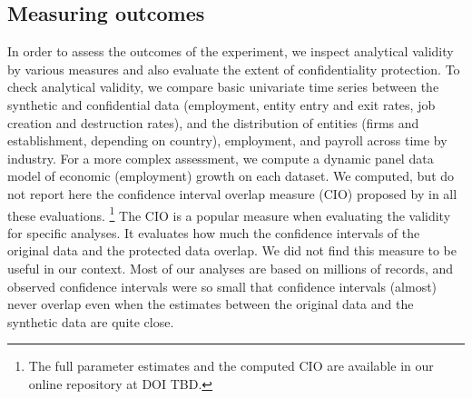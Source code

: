 \subsection{Measuring outcomes}

In order to assess the outcomes of the experiment, we inspect analytical validity by various measures and also evaluate the extent of confidentiality protection. To check analytical validity, we compare basic univariate time series between the synthetic and confidential data (employment, entity entry and exit rates, job creation and destruction rates), and the distribution of entities (firms and establishment, depending on country),  employment, and payroll across time by industry. For a more complex assessment, we compute a dynamic panel data model of economic (employment) growth on each dataset. 
We computed, but do not report here the confidence interval overlap measure (CIO) proposed by \citet{tas2006,Woo_Reiter_Oganian_Karr_2009} in all these evaluations.%
\footnote{The full parameter estimates and the computed CIO are available in our online repository at DOI TBD.}
The CIO is a popular measure when evaluating the validity for specific analyses. It evaluates how much the confidence intervals of the original data and the protected data overlap. We did not find this measure to be useful in our context. Most of our analyses are based on millions of records, and observed confidence intervals were so small that confidence intervals (almost) never overlap even when the estimates between the original data and the synthetic data are quite close. 
%

